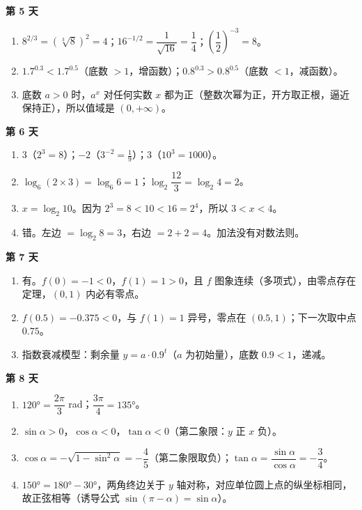 \documentclass[UTF8,a4paper,11pt]{ctexart}
\begin{document}
\textbf{第 5 天}
\begin{enumerate}
  \item $8^{2/3} = (\sqrt[3]{8})^2 = 4$；$16^{-1/2} = \dfrac{1}{\sqrt{16}} = \dfrac{1}{4}$；$\left(\dfrac12\right)^{-3} = 8$。
  \item $1.7^{0.3} < 1.7^{0.5}$（底数 $>1$，增函数）；$0.8^{0.3} > 0.8^{0.5}$（底数 $<1$，减函数）。
  \item 底数 $a > 0$ 时，$a^x$ 对任何实数 $x$ 都为正（整数次幂为正，开方取正根，逼近保持正），所以值域是 $(0,+\infty)$。
\end{enumerate}

\textbf{第 6 天}
\begin{enumerate}
  \item $3$（$2^3=8$）；$-2$（$3^{-2}=\frac19$）；$3$（$10^3=1000$）。
  \item $\log_6(2\times3) = \log_6 6 = 1$；$\log_2\dfrac{12}{3} = \log_2 4 = 2$。
  \item $x = \log_2 10$。因为 $2^3 = 8 < 10 < 16 = 2^4$，所以 $3 < x < 4$。
  \item 错。左边 $= \log_2 8 = 3$，右边 $= 2 + 2 = 4$。加法没有对数法则。
\end{enumerate}

\textbf{第 7 天}
\begin{enumerate}
  \item 有。$f(0) = -1 < 0$，$f(1) = 1 > 0$，且 $f$ 图象连续（多项式），由零点存在定理，$(0,1)$ 内必有零点。
  \item $f(0.5) = -0.375 < 0$，与 $f(1) = 1$ 异号，零点在 $(0.5, 1)$；下一次取中点 $0.75$。
  \item 指数衰减模型：剩余量 $y = a \cdot 0.9^t$（$a$ 为初始量），底数 $0.9 < 1$，递减。
\end{enumerate}

\textbf{第 8 天}
\begin{enumerate}
  \item $120° = \dfrac{2\pi}{3}$ rad；$\dfrac{3\pi}{4} = 135°$。
  \item $\sin\alpha > 0$，$\cos\alpha < 0$，$\tan\alpha < 0$（第二象限：$y$ 正 $x$ 负）。
  \item $\cos\alpha = -\sqrt{1-\sin^2\alpha} = -\dfrac{4}{5}$（第二象限取负）；$\tan\alpha = \dfrac{\sin\alpha}{\cos\alpha} = -\dfrac{3}{4}$。
  \item $150° = 180° - 30°$，两角终边关于 $y$ 轴对称，对应单位圆上点的纵坐标相同，故正弦相等（诱导公式 $\sin(\pi-\alpha) = \sin\alpha$）。
\end{enumerate}
\end{document}
